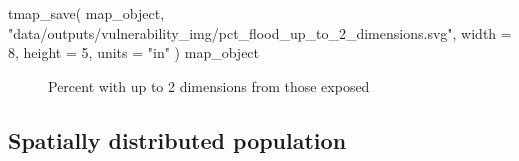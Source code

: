 \documentclass[
  letterpaper,
  DIV=11,
  numbers=noendperiod]{scrartcl}
\newenvironment{Shaded}{}{}
\newcommand{\AttributeTok}[1]{\textcolor[rgb]{0.84,0.23,0.29}{#1}}
\newcommand{\DecValTok}[1]{\textcolor[rgb]{0.00,0.36,0.77}{#1}}
\newcommand{\FunctionTok}[1]{\textcolor[rgb]{0.44,0.26,0.76}{#1}}
\newcommand{\NormalTok}[1]{\textcolor[rgb]{0.14,0.16,0.18}{#1}}
\newcommand{\StringTok}[1]{\textcolor[rgb]{0.01,0.18,0.38}{#1}}
\begin{document}
\begin{Shaded}
\begin{Highlighting}[]
\FunctionTok{tmap\_save}\NormalTok{(}
\NormalTok{  map\_object,}
  \StringTok{"data/outputs/vulnerability\_img/pct\_flood\_up\_to\_2\_dimensions.svg"}\NormalTok{,}
  \AttributeTok{width =} \DecValTok{8}\NormalTok{,}
  \AttributeTok{height =} \DecValTok{5}\NormalTok{,}
  \AttributeTok{units =} \StringTok{"in"}
\NormalTok{)}
\NormalTok{map\_object}
\end{Highlighting}
\end{Shaded}

\begin{figure}[H]


\caption{\label{fig-up-to-2-dimensions}Percent with up to 2 dimensions
from those exposed}

\end{figure}%

\subsection{Spatially distributed
population}\label{spatially-distributed-population}
\end{document}
